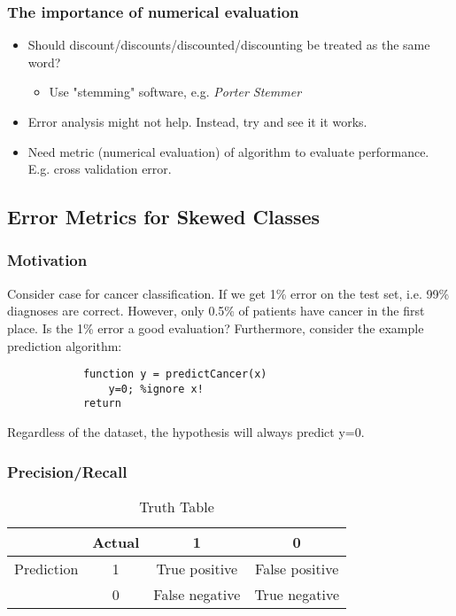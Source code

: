     \subsubsection{The importance of numerical evaluation}
        \begin{itemize}
            \item Should discount/discounts/discounted/discounting be treated as the same word? 
                \begin{itemize}
                    \item Use "stemming" software, e.g. \emph{Porter Stemmer}
                \end{itemize}
            \item Error analysis might not help. Instead, try and see it it works.
            \item Need metric (numerical evaluation) of algorithm to evaluate performance. E.g. cross validation error.
        \end{itemize}
\subsection{Error Metrics for Skewed Classes}
    \subsubsection{Motivation} 
        Consider case for cancer classification. If we get 1\% error on the test set, i.e. 99\% diagnoses are correct. However, only 0.5\% of patients have cancer in the first place. Is the 1\% error a good evaluation?
        Furthermore, consider the example prediction algorithm:
        \begin{lstlisting}
            function y = predictCancer(x)
                y=0; %ignore x!
            return
        \end{lstlisting}

        Regardless of the dataset, the hypothesis will always predict y=0. 
    \subsubsection{Precision/Recall}

        \begin{table}[htbp]
                \begin{center}
                     \begin{tabular}{|c||c|c|c|}
                         \hline
                         & Actual &   1               &   0  \\
                         \hline
                         \hline
                         Prediction &1               &   True positive   &   False positive  \\
                         \hline 
                         & 0               &   False negative  &   True negative   \\
                         \hline
                    \end{tabular}
                 \caption{Truth Table}
                 \label{tab:truth-table}
             \end{center}
         \end{table}


